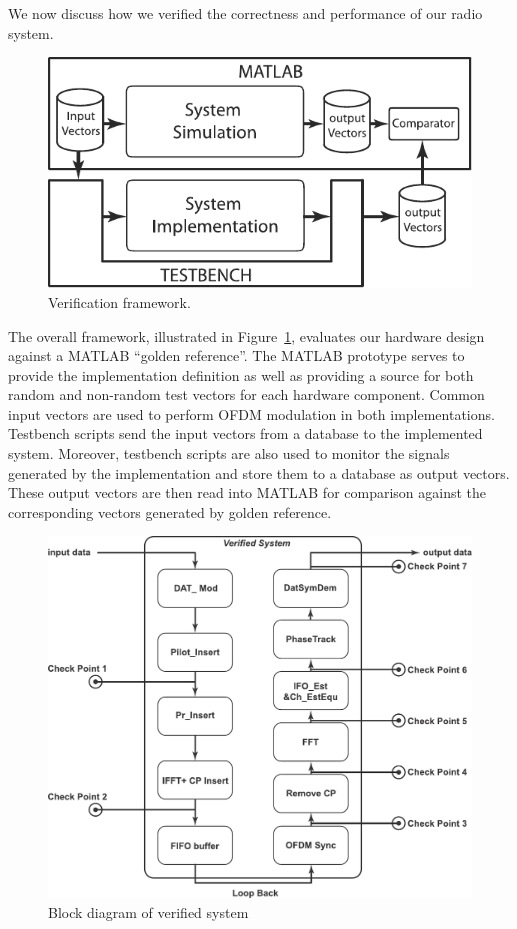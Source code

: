 We now discuss how we verified the correctness and performance of our radio system.
\begin{figure}
	\centering
	\includegraphics[width=0.9\columnwidth]{Figures/Veirification.pdf}
	\caption{Verification framework.}
	\label{fig:Ver}
\end{figure}
The overall framework, illustrated in Figure~\ref{fig:Ver}, evaluates our hardware design against a MATLAB ``golden reference''. The MATLAB prototype serves to provide the implementation definition as well as providing a source for both random and non-random test vectors for each hardware component.
Common input vectors are used to perform OFDM modulation in both implementations. Testbench scripts send the input vectors from a database to the implemented system. Moreover, testbench scripts are also used to monitor the signals generated by the implementation and store them to a database as output vectors. These output vectors are then read into MATLAB for comparison against the corresponding vectors generated by golden reference.

\begin{figure}
	\centering
	\includegraphics[width=0.9\columnwidth]{Figures/VerifiedSystem.pdf}
	\caption{Block diagram of verified system}
	\label{fig:VerSys}
\end{figure}

